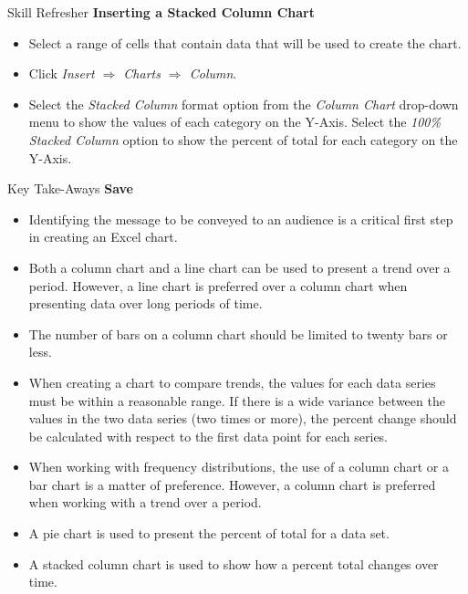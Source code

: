 \begin{center}
	\begin{sklbox}{Skill Refresher}
		\textbf{Inserting a Stacked Column Chart}
		\\
		\begin{itemize}
			\setlength{\itemsep}{0pt}
			\setlength{\parskip}{0pt}
			\setlength{\parsep}{0pt}

			\item Select a range of cells that contain data that will be used to create the chart.
			\item Click \textit{Insert $ \Rightarrow $ Charts $ \Rightarrow $ Column}.
			\item Select the \textit{Stacked Column} format option from the \textit{Column Chart} drop-down menu to show the values of each category on the Y-Axis. Select the \textit{100\% Stacked Column} option to show the percent of total for each category on the Y-Axis.
			
		\end{itemize}
	\end{sklbox}
\end{center}

\begin{center}
	\begin{tkwbox}{Key Take-Aways}
		\textbf{Save}
		\\
		\begin{itemize}
			\setlength{\itemsep}{0pt}
			\setlength{\parskip}{0pt}
			\setlength{\parsep}{0pt}
			
			\item Identifying the message to be conveyed to an audience is a critical first step in creating an Excel chart.
			\item Both a column chart and a line chart can be used to present a trend over a period. However, a line chart is preferred over a column chart when presenting data over long periods of time.
			\item The number of bars on a column chart should be limited to twenty bars or less.
			\item When creating a chart to compare trends, the values for each data series must be within a reasonable range. If there is a wide variance between the values in the two data series (two times or more), the percent change should be calculated with respect to the first data point for each series.
			\item When working with frequency distributions, the use of a column chart or a bar chart is a matter of preference. However, a column chart is preferred when working with a trend over a period.
			\item A pie chart is used to present the percent of total for a data set.
			\item A stacked column chart is used to show how a percent total changes over time.

		\end{itemize}
	\end{tkwbox}
\end{center}

